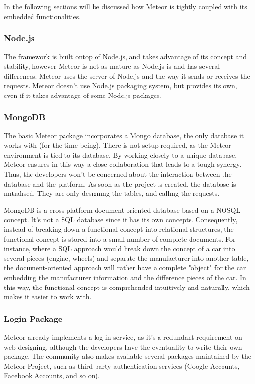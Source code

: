 \documentclass{article}
\begin{document}
\noindent In the following sections will be discussed how Meteor is tightly coupled with its embedded functionalities.

\subsubsection{Node.js}
The framework is built ontop of Node.js, and takes advantage of its concept and stability, however Meteor is not as mature as Node.js is and has several differences. Meteor uses the server of Node.js and the way it sends or receives the requests. Meteor doesn't use Node.js packaging system, but provides its own, even if it takes advantage of some Node.js packages.

\subsubsection{MongoDB}
The basic Meteor package incorporates a Mongo database, the only database it works with (for the time being). There is not setup required, as the Meteor environment is tied to its database. By working closely to a unique database, Meteor ensures in this way a close collaboration that leads to a tough synergy. Thus, the developers won't be concerned about the interaction between the database and the platform. As soon as the project is created, the database is initialised. They are only designing the tables, and calling the requests.\\\par
\noindent MongoDB is a cross-platform document-oriented database based on a NOSQL concept. It's not a SQL database since it has its own concepts. Consequently, instead of breaking down a functional concept into relational structures, the functional concept is stored into a small number of complete documents. For instance, where a SQL approach would break down the concept of a car into several pieces (engine, wheels) and separate the manufacturer into another table, the document-oriented approach will rather have a complete "object" for the car embedding the manufacturer information and the difference pieces of the car. In this way, the functional concept is comprehended intuitively and naturally, which makes it easier to work with.

\subsubsection{Login Package}
Meteor already implements a log in service, as it's a redundant requirement on web designing, although the developers have the eventuality to write their own package. The community also makes available several packages maintained by the Meteor Project, such as third-party authentication services (Google Accounts, Facebook Accounts, and so on).\\\par
\end{document}
